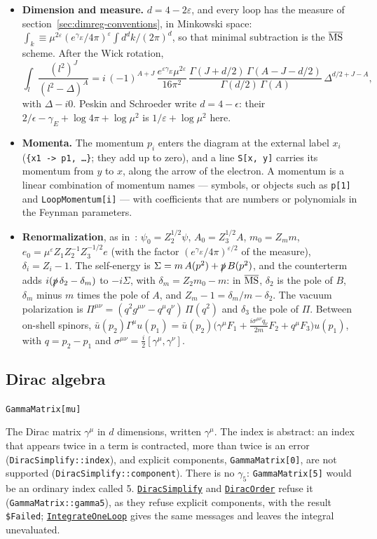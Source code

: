 \documentclass[11pt,a4paper]{article}
\makeatletter
\newcommand{\pkg}[1]{\texttt{#1}}
\newenvironment{function}[1]{\par\if@nobreak\else\medskip\needspace{4\baselineskip}\fi\noindent\phantomsection\label{fn:#1}%
  \begin{fnbox}}{\end{fnbox}\par\nobreak}
\newcommand{\syntax}[1]{\texttt{#1}\par}
\newcommand{\fnref}[1]{\hyperref[fn:#1]{\pkg{#1}}}
\makeatother
\begin{document}
\begin{itemize}
\item \textbf{Dimension and measure.} $d=4-2\varepsilon$, and every loop has the measure of
  section~\ref{sec:dimreg-conventions}, in Minkowski space: $\int_k\equiv\mu^{2\varepsilon}(e^{\gamma_E}/4\pi)^\varepsilon\int
  d^dk/(2\pi)^d$, so that minimal subtraction is the $\overline{\rm MS}$ scheme. After the Wick rotation,
  \[
  \int_l\frac{(l^2)^J}{(l^2-\Delta)^A}=i\,(-1)^{A+J}\,\frac{e^{\varepsilon\gamma_E}\mu^{2\varepsilon}}{16\pi^2}\,
  \frac{\Gamma(J+d/2)\,\Gamma(A-J-d/2)}{\Gamma(d/2)\,\Gamma(A)}\,\Delta^{d/2+J-A},
  \]
  with $\Delta-i0$. Peskin and Schroeder write $d=4-\epsilon$: their $2/\epsilon-\gamma_E+\log4\pi+\log\mu^2$ is
  $1/\varepsilon+\log\mu^2$ here.
\item \textbf{Momenta.} The momentum $p_i$ enters the diagram at the external label $x_i$ (\pkg{\{x1 -> p1, \dots\}}; they
  add up to zero), and a line \pkg{S[x, y]} carries its momentum from $y$ to $x$, along the arrow of the electron. A
  momentum is a linear combination of momentum names --- symbols, or objects such as \pkg{p[1]} and \pkg{LoopMomentum[i]}
  --- with coefficients that are numbers or polynomials in the Feynman parameters.
\item \textbf{Renormalization}, as in~\cite[section~10.3]{PeskinSchroeder}: $\psi_0=Z_2^{1/2}\psi$, $A_0=Z_3^{1/2}A$,
  $m_0=Z_mm$, $e_0=\mu^\varepsilon Z_1Z_2^{-1}Z_3^{-1/2}e$ (with the factor $(e^{\gamma_E}/4\pi)^{\varepsilon/2}$ of the measure),
  $\delta_i=Z_i-1$. The self-energy is $\Sigma=m\,A(p^2)+\slashed p\,B(p^2)$, and the counterterm adds
  $i(\slashed p\,\delta_2-\delta_m)$ to $-i\Sigma$, with $\delta_m=Z_2m_0-m$: in $\overline{\rm MS}$, $\delta_2$ is the pole
  of $B$, $\delta_m$ minus $m$ times the pole of $A$, and $Z_m-1=\delta_m/m-\delta_2$. The vacuum polarization is
  $\Pi^{\mu\nu}=(q^2g^{\mu\nu}-q^\mu q^\nu)\,\Pi(q^2)$ and $\delta_3$ the pole of $\Pi$. Between on-shell spinors,
  $\bar u(p_2)\Gamma^\mu u(p_1)=\bar u(p_2)\bigl(\gamma^\mu F_1+\frac{i\sigma^{\mu\nu}q_\nu}{2m}F_2+q^\mu F_3\bigr)u(p_1)$,
  with $q=p_2-p_1$ and $\sigma^{\mu\nu}=\frac i2[\gamma^\mu,\gamma^\nu]$.
\end{itemize}

\subsection{Dirac algebra}

\begin{function}{GammaMatrix}
\syntax{GammaMatrix[mu]}
\end{function}
The Dirac matrix $\gamma^\mu$ in $d$ dimensions, written $\gamma^\mu$. The index is abstract: an index that appears twice
in a term is contracted, more than twice is an error (\pkg{DiracSimplify::index}), and explicit components,
\pkg{GammaMatrix[0]}, are not supported (\pkg{DiracSimplify::component}). There is no $\gamma_5$: \pkg{GammaMatrix[5]}
would be an ordinary index called 5. \fnref{DiracSimplify} and \fnref{DiracOrder} refuse it (\pkg{GammaMatrix::gamma5}), as
they refuse explicit components, with the result \pkg{\$Failed}; \fnref{IntegrateOneLoop} gives the same messages and
leaves the integral unevaluated.
\end{document}
